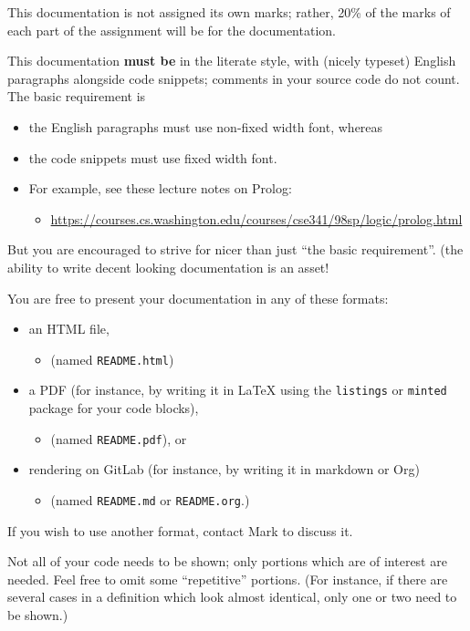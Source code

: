 \documentclass[11pt]{article}
\begin{document}
This documentation is not assigned its own marks;
rather, 20\% of the marks of each part of the assignment
will be for the documentation.

This documentation \textbf{must be} in the literate style,
with (nicely typeset) English paragraphs alongside code snippets;
comments in your source code do not count.
The basic requirement is
\begin{itemize}
\item the English paragraphs must use non-fixed width font, whereas
\item the code snippets must use fixed width font.
\item For example, see these lecture notes on Prolog:
\begin{itemize}
\item \url{https://courses.cs.washington.edu/courses/cse341/98sp/logic/prolog.html}
\end{itemize}
\end{itemize}
But you are encouraged to strive for nicer than just
“the basic requirement”.
(the ability to write decent looking documentation is an asset!

You are free to present your documentation in any of these formats:
\begin{itemize}
\item an HTML file,
\begin{itemize}
\item (named \texttt{README.html})
\end{itemize}
\item a PDF (for instance, by writing it in \LaTeX{} using
the \texttt{listings} or \texttt{minted} package for your code blocks),
\begin{itemize}
\item (named \texttt{README.pdf}), or
\end{itemize}
\item rendering on GitLab (for instance, by writing it in markdown or Org)
\begin{itemize}
\item (named \texttt{README.md} or \texttt{README.org}.)
\end{itemize}
\end{itemize}
If you wish to use another format, contact Mark to discuss it.

Not all of your code needs to be shown;
only portions which are of interest are needed.
Feel free to omit some “repetitive” portions.
(For instance, if there are several cases in a definition
which look almost identical, only one or two need to be shown.)
\end{document}
